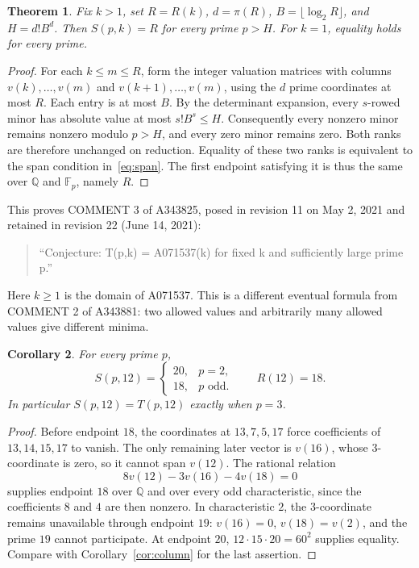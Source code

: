 \documentclass[11pt]{article}
\newtheorem{theorem}{Theorem}
\newtheorem{corollary}[theorem]{Corollary}
\begin{document}
\begin{theorem}\label{thm:sequenceeventual}
Fix $k>1$, set $R=R(k)$, $d=\pi(R)$, $B=\lfloor\log_2 R\rfloor$,
and $H=d!B^d$. Then $S(p,k)=R$ for every prime $p>H$.
For $k=1$, equality holds for every prime.
\end{theorem}
\begin{proof}
For each $k\le m\le R$, form the integer valuation matrices with
columns $v(k),\ldots,v(m)$ and $v(k+1),\ldots,v(m)$, using the $d$
prime coordinates at most $R$. Each entry is at most $B$.
By the determinant expansion, every $s$-rowed minor has absolute value
at most $s!B^s\le H$. Consequently every nonzero minor remains nonzero
modulo $p>H$, and every zero minor remains zero. Both ranks are therefore
unchanged on reduction. Equality of these two ranks is equivalent to the
span condition in~\eqref{eq:span}. The first endpoint satisfying it is
thus the same over $\mathbb Q$ and $\mathbb F_p$, namely $R$.
\end{proof}
This proves COMMENT 3 of A343825, posed in revision 11 on May 2, 2021
and retained in revision 22 (June 14, 2021):
\begin{quote}
``Conjecture: T(p,k) = A071537(k) for fixed k and sufficiently large prime p.''
\end{quote}
Here $k\ge1$ is the domain of A071537. This is a different eventual
formula from COMMENT 2 of A343881: two allowed values and arbitrarily
many allowed values give different minima.

\begin{corollary}\label{cor:sequencecolumn}
For every prime $p$,
\[
 S(p,12)=\begin{cases}20,&p=2,\\18,&p\text{ odd}.\end{cases}
 \qquad R(12)=18.
\]
In particular $S(p,12)=T(p,12)$ exactly when $p=3$.
\end{corollary}
\begin{proof}
Before endpoint $18$, the coordinates at $13,7,5,17$ force coefficients
of $13,14,15,17$ to vanish. The only remaining later vector is
$v(16)$, whose $3$-coordinate is zero, so it cannot span $v(12)$.
The rational relation
\[
 8v(12)-3v(16)-4v(18)=0
\]
supplies endpoint $18$ over $\mathbb Q$ and over every odd characteristic,
since the coefficients $8$ and $4$ are then nonzero.
In characteristic $2$, the $3$-coordinate remains unavailable through
endpoint $19$: $v(16)=0$, $v(18)=v(2)$, and the prime $19$ cannot
participate. At endpoint $20$, $12\cdot15\cdot20=60^2$ supplies equality.
Compare with Corollary~\ref{cor:column} for the last assertion.
\end{proof}
\end{document}
